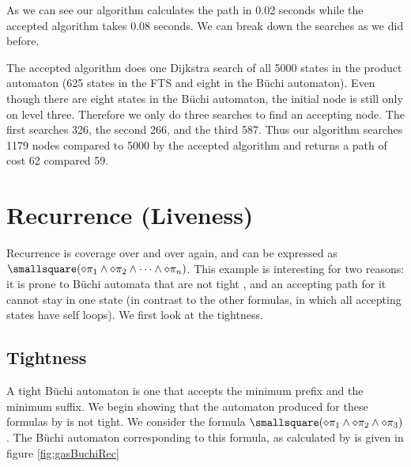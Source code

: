 As we can see our algorithm calculates the path in 0.02 seconds while the accepted algorithm takes 0.08 seconds. We can break down the searches as we did before. 

The accepted algorithm does one Dijkstra search of all 5000 states in the product automaton (625 states in the FTS and eight in the B\"uchi automaton). Even though there are eight states in the B\"uchi automaton, the initial node is still only on level three. Therefore we only do three searches to find an accepting node. The first searches 326, the second 266, and the third 587. Thus our algorithm searches 1179 nodes compared to 5000 by the accepted algorithm and returns a path of cost 62 compared 59.

\section{Recurrence (Liveness)}
Recurrence is coverage over and over again, and can be expressed as $\smallsquare(\diamond \pi_1 \land \diamond \pi_2 \land \dots \land \diamond \pi_n)$. This example is interesting for two reasons: it is prone to B\"{u}chi automata that are not tight \cite{schuppan05}, and an accepting path for it cannot stay in one state (in contrast to the other formulas, in which all accepting states have self loops). We first look at the tightness.

\subsection{Tightness}
A tight B\"uchi automaton is one that accepts the minimum prefix and the minimum suffix. We begin showing that the automaton produced for these formulas by \cite{ltlbuchiwebsite} is not tight. We consider the formula $\smallsquare(\diamond \pi_1 \land \diamond \pi_2 \land \diamond \pi_3)$. The B\"{u}chi automaton corresponding to this formula, as calculated by \cite{gastin01} is given in figure \ref{fig:gasBuchiRec}

